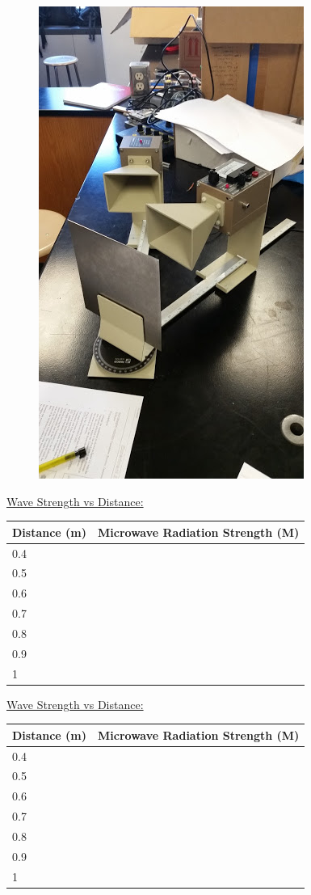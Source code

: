 \documentclass[11pt, titlepage]{article}
\begin{document}
\begin{figure}[h]
\centering
\hspace*{0cm}
\includegraphics[scale=1]{lab62.jpg}
\vspace*{0cm}
\end{figure}

\underline{Wave Strength vs Distance:}
\begin{center}
\begin{tabular}
{|m{9em}|m{12em}|}
\hline
Distance (m) & Microwave Radiation Strength (M) \\
\hline
0.4 & \\
\hline
0.5 & \\
\hline
0.6 & \\
\hline
0.7 & \\
\hline
0.8 & \\
\hline
0.9 & \\
\hline
1 & \\
\hline
\end{tabular}
\end{center}

\underline{Wave Strength vs Distance:}
\begin{center}
\begin{tabular}
{|m{9em}|m{12em}|}
\hline
Distance (m) & Microwave Radiation Strength (M) \\
\hline
0.4 & \\
\hline
0.5 & \\
\hline
0.6 & \\
\hline
0.7 & \\
\hline
0.8 & \\
\hline
0.9 & \\
\hline
1 & \\
\hline
\end{tabular}
\end{center}
\end{document}
